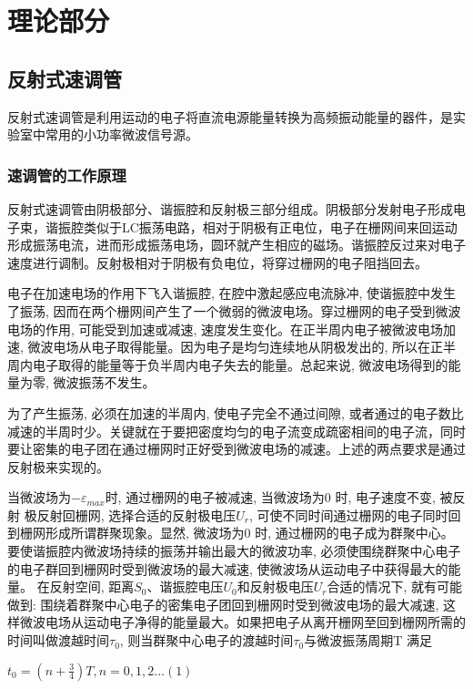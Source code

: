 \documentclass{hfutpaper}
\begin{document}
\section{理论部分}
\subsection{反射式速调管}
反射式速调管是利用运动的电子将直流电源能量转换为高频振动能量的器件，是实验室中常用的小功率微波信号源。

\subsubsection{速调管的工作原理}
反射式速调管由阴极部分、谐振腔和反射极三部分组成。阴极部分发射电子形成电子束，谐振腔类似于LC振荡电路，相对于阴极有正电位，电子在栅网间来回运动形成振荡电流，进而形成振荡电场，圆环就产生相应的磁场。谐振腔反过来对电子速度进行调制。反射极相对于阴极有负电位，将穿过栅网的电子阻挡回去。

电子在加速电场的作用下飞入谐振腔, 在腔中激起感应电流脉冲, 使谐振腔中发生了振荡, 因而在两个栅网间产生了一个微弱的微波电场。穿过栅网的电子受到微波电场的作用, 可能受到加速或减速, 速度发生变化。在正半周内电子被微波电场加速, 微波电场从电子取得能量。因为电子是均匀连续地从阴极发出的, 所以在正半周内电子取得的能量等于负半周内电子失去的能量。总起来说, 微波电场得到的能量为零, 微波振荡不发生。

为了产生振荡, 必须在加速的半周内, 使电子完全不通过间隙, 或者通过的电子数比减速的半周时少。关键就在于要把密度均匀的电子流变成疏密相间的电子流，同时要让密集的电子团在通过栅网时正好受到微波电场的减速。上述的两点要求是通过反射极来实现的。

当微波场为$-\varepsilon_{max}$时, 通过栅网的电子被减速, 当微波场为0 时, 电子速度不变, 被反射 极反射回栅网, 选择合适的反射极电压$U_{r}$, 可使不同时间通过栅网的电子同时回到栅网形成所谓群聚现象。显然, 微波场为0 时, 通过栅网的电子成为群聚中心。要使谐振腔内微波场持续的振荡并输出最大的微波功率, 必须使围绕群聚中心电子的电子群回到栅网时受到微波场的最大减速, 使微波场从运动电子中获得最大的能量。 在反射空间, 距离$S_{0}$、谐振腔电压$U_{0}$和反射极电压$U_{r}$合适的情况下, 就有可能做到: 围绕着群聚中心电子的密集电子团回到栅网时受到微波电场的最大减速, 这样微波电场从运动电子净得的能量最大。如果把电子从离开栅网至回到栅网所需的时间叫做渡越时间$\tau_{0}$, 则当群聚中心电子的渡越时间$\tau_{0}$与微波振荡周期T 满足


\begin{center}
$t_{0} = (n+\frac{3}{4})T, n=0,1,2...(1)$
\end{center}
\end{document}
